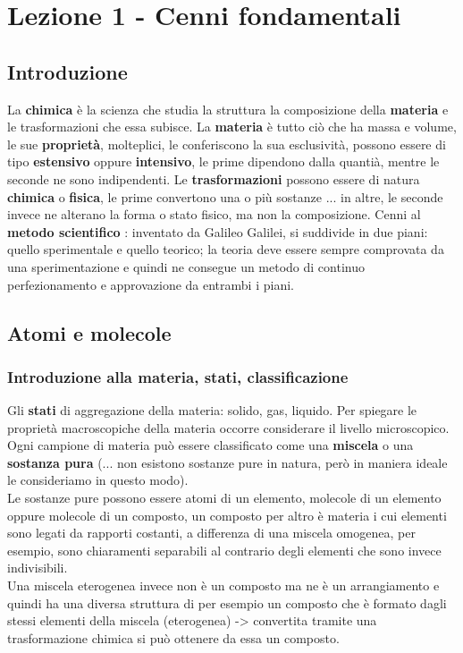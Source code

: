 \chapter{Lezione 1 - Cenni fondamentali}




\section{Introduzione}
La \textbf{chimica} è la scienza che studia la struttura la composizione della \textbf{materia} e le trasformazioni che essa subisce. La \textbf{materia} è tutto ciò che ha massa e volume, le sue \textbf{proprietà}, molteplici, le conferiscono la sua esclusività, possono essere di tipo \textbf{estensivo} oppure \textbf{intensivo}, le prime dipendono dalla quantià, mentre le seconde ne sono indipendenti. Le \textbf{trasformazioni} possono essere di natura \textbf{chimica} o \textbf{fisica}, le prime convertono una o più sostanze ... in altre, le seconde invece ne alterano la forma o stato fisico, ma non la composizione. Cenni al \textbf{metodo scientifico} : inventato da Galileo Galilei, si suddivide in due piani: quello sperimentale e quello teorico; la teoria deve essere sempre comprovata da una sperimentazione e quindi ne consegue un metodo di continuo perfezionamento e approvazione da entrambi i piani.


\section{Atomi e molecole}
\subsection{Introduzione alla materia, stati, classificazione}
Gli \textbf{stati} di aggregazione della materia: solido, gas, liquido. Per spiegare le proprietà macroscopiche della materia occorre considerare il livello microscopico.
Ogni campione di materia può essere classificato come una \textbf{miscela} o una \textbf{sostanza pura} (... non esistono sostanze pure in natura, però in maniera ideale le consideriamo in questo modo).\\
Le sostanze pure possono essere atomi di un elemento, molecole di un elemento oppure molecole di un composto, un composto per altro è materia i cui elementi sono legati da rapporti costanti, a differenza di una miscela omogenea, per esempio, sono chiaramenti separabili al contrario degli elementi che sono invece indivisibili.\\
Una miscela eterogenea invece non è un composto ma ne è un arrangiamento e quindi ha una diversa struttura di per esempio un composto che è formato dagli stessi elementi della miscela (eterogenea) -> convertita tramite una trasformazione chimica si può ottenere da essa un composto. \\
